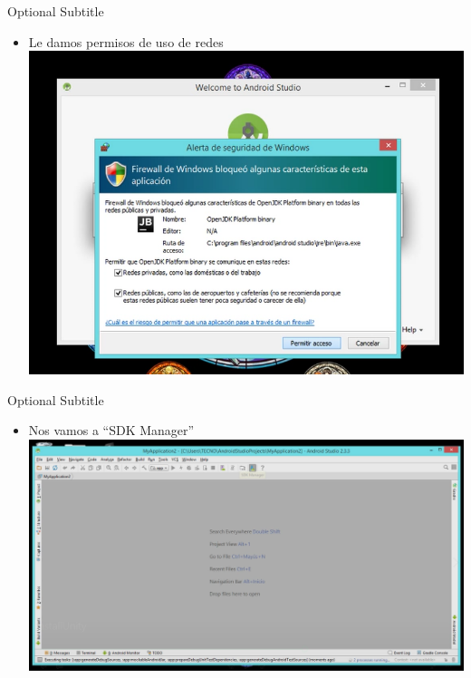 \documentclass{beamer}
\begin{document}
\begin{frame}{15}{Optional Subtitle}
  \begin{itemize}
  \item {
    Le damos permisos de uso de redes
  }
  \includegraphics[width=\linewidth]{image/IU15}
  \end{itemize}
\end{frame}

\begin{frame}{16}{Optional Subtitle}
  \begin{itemize}
  \item {
    Nos vamos a “SDK Manager”
  }
  \includegraphics[width=\linewidth]{image/IU16}
  \end{itemize}
\end{frame}
\end{document}
